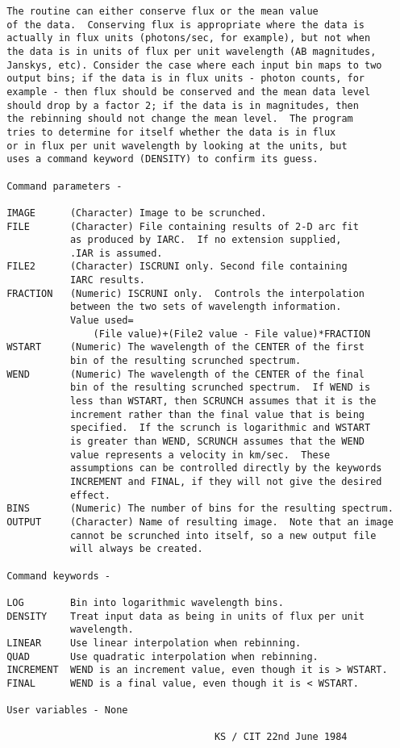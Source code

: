 \begin{description}
\begin{verbatim}
 The routine can either conserve flux or the mean value
 of the data.  Conserving flux is appropriate where the data is
 actually in flux units (photons/sec, for example), but not when
 the data is in units of flux per unit wavelength (AB magnitudes,
 Janskys, etc). Consider the case where each input bin maps to two
 output bins; if the data is in flux units - photon counts, for
 example - then flux should be conserved and the mean data level
 should drop by a factor 2; if the data is in magnitudes, then
 the rebinning should not change the mean level.  The program
 tries to determine for itself whether the data is in flux
 or in flux per unit wavelength by looking at the units, but
 uses a command keyword (DENSITY) to confirm its guess.

 Command parameters -

 IMAGE      (Character) Image to be scrunched.
 FILE       (Character) File containing results of 2-D arc fit
            as produced by IARC.  If no extension supplied,
            .IAR is assumed.
 FILE2      (Character) ISCRUNI only. Second file containing
            IARC results.
 FRACTION   (Numeric) ISCRUNI only.  Controls the interpolation
            between the two sets of wavelength information.
            Value used=
                (File value)+(File2 value - File value)*FRACTION
 WSTART     (Numeric) The wavelength of the CENTER of the first
            bin of the resulting scrunched spectrum.
 WEND       (Numeric) The wavelength of the CENTER of the final
            bin of the resulting scrunched spectrum.  If WEND is
            less than WSTART, then SCRUNCH assumes that it is the
            increment rather than the final value that is being
            specified.  If the scrunch is logarithmic and WSTART
            is greater than WEND, SCRUNCH assumes that the WEND
            value represents a velocity in km/sec.  These
            assumptions can be controlled directly by the keywords
            INCREMENT and FINAL, if they will not give the desired
            effect.
 BINS       (Numeric) The number of bins for the resulting spectrum.
 OUTPUT     (Character) Name of resulting image.  Note that an image
            cannot be scrunched into itself, so a new output file
            will always be created.

 Command keywords -

 LOG        Bin into logarithmic wavelength bins.
 DENSITY    Treat input data as being in units of flux per unit
            wavelength.
 LINEAR     Use linear interpolation when rebinning.
 QUAD       Use quadratic interpolation when rebinning.
 INCREMENT  WEND is an increment value, even though it is > WSTART.
 FINAL      WEND is a final value, even though it is < WSTART.

 User variables - None

                                     KS / CIT 22nd June 1984
\end{verbatim}
\end{description}
